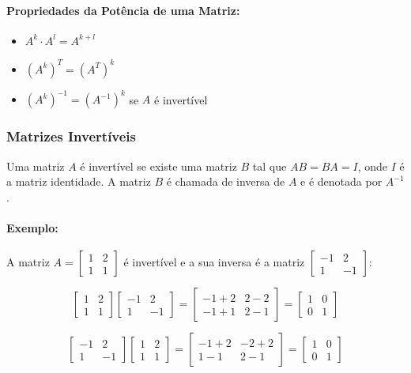 \paragraph{Propriedades da Potência de uma Matriz:}

\begin{itemize}
    \item $A^k \cdot A^l = A^{k+l}$
    \item ${(A^k)}^T = (A^T)^k$
    \item ${(A^k)}^{-1} = (A^{-1})^k$ se $A$ é invertível
\end{itemize}

\subsubsection{Matrizes Invertíveis}
\indent

Uma matriz $A$ é invertível se existe uma matriz $B$ tal que $AB = BA = I$, onde $I$ é a matriz identidade. A matriz $B$ é chamada de inversa de $A$ e é denotada por $A^{-1}$.

\paragraph{Exemplo:}

A matriz \( A = \begin{bmatrix} 1 & 2 \\ 1 & 1 \end{bmatrix} \) é invertível e a sua inversa é a matriz \( \begin{bmatrix} -1 & 2 \\ 1 & -1 \end{bmatrix} \):

\[
\begin{bmatrix} 1 & 2 \\ 1 & 1 \end{bmatrix}
\begin{bmatrix} -1 & 2 \\ 1 & -1 \end{bmatrix} =
\begin{bmatrix} -1+2 & 2-2 \\ -1+1 & 2-1 \end{bmatrix} =
\begin{bmatrix} 1 & 0 \\ 0 & 1 \end{bmatrix}
\]

\[
\begin{bmatrix} -1 & 2 \\ 1 & -1 \end{bmatrix}
\begin{bmatrix} 1 & 2 \\ 1 & 1 \end{bmatrix} =
\begin{bmatrix} -1+2 & -2+2 \\ 1-1 & 2-1 \end{bmatrix} =
\begin{bmatrix} 1 & 0 \\ 0 & 1 \end{bmatrix}
\]


